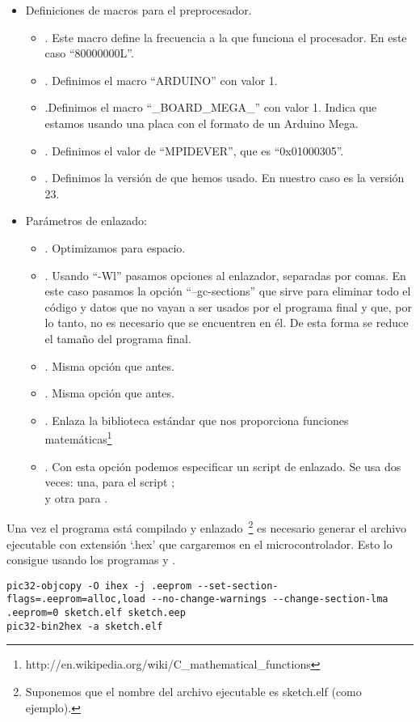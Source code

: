 \begin{itemize}
    \item Definiciones de macros para el preprocesador.
    \begin{itemize}
        \item {}. Este macro define la frecuencia a la que funciona el procesador. En este caso ``80000000L''.
        \item {}. Definimos el macro ``ARDUINO'' con valor 1.
        \item {}.Definimos el macro ``\_BOARD\_MEGA\_'' con valor 1. Indica que estamos usando una placa con el formato de un Arduino Mega.
        \item {}. Definimos el valor de ``MPIDEVER'', que es ``0x01000305''.
        \item {}. Definimos la versión de  que hemos usado. En nuestro caso es la versión 23.
    \end{itemize}
    \item Parámetros de enlazado:
        \begin{itemize}
            \item {}. Optimizamos para espacio.
            \item {}. Usando ``-Wl'' pasamos opciones al enlazador, separadas por comas. En este caso pasamos la opción ``--gc-sections'' que sirve para eliminar todo el código y datos que no vayan a ser usados por el programa final y que, por lo tanto, no es necesario que se encuentren en él. De esta forma se reduce el tamaño del programa final.
            \item {}. Misma opción que antes.
            \item {}. Misma opción que antes.
            \item {}. Enlaza la biblioteca estándar  que nos proporciona funciones matemáticas\protect\footnote{http://en.wikipedia.org/wiki/C\_mathematical\_functions}
            \item {}. Con esta opción podemos especificar un script de enlazado. Se usa dos veces: una, para el script ;\\  y otra para .
        \end{itemize}
\end{itemize}

Una vez el programa está compilado y enlazado~\protect\footnote{Suponemos que el nombre del archivo ejecutable es sketch.elf (como ejemplo).} es necesario generar el archivo ejecutable con extensión `.hex' que cargaremos en el microcontrolador. Esto lo consigue  usando los programas  y .
\begin{lstlisting}[breaklines=true]
pic32-objcopy -O ihex -j .eeprom --set-section-flags=.eeprom=alloc,load --no-change-warnings --change-section-lma .eeprom=0 sketch.elf sketch.eep
pic32-bin2hex -a sketch.elf
\end{lstlisting}

